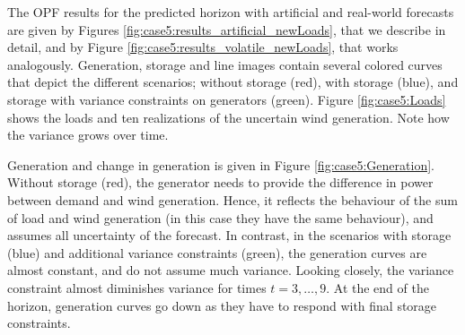 \documentclass[final,3p,times,twocolumn]{elsarticle}  %
\begin{document}

The OPF results for the predicted horizon with artificial and real-world forecasts are given by Figures \ref{fig:case5:results_artificial_newLoads}, that we describe in detail, and by Figure \ref{fig:case5:results_volatile_newLoads}, that works analogously.
Generation, storage and line images contain several colored curves that depict the different scenarios; without storage (red), with storage (blue), and storage with variance constraints on generators (green).
Figure \ref{fig:case5:Loads} shows the loads and ten realizations of the uncertain wind generation. Note how the variance grows over time.

Generation and change in generation is given in Figure \ref{fig:case5:Generation}. Without storage (red), the generator needs to provide the difference in power between demand and wind generation. Hence, it reflects the behaviour of the sum of load and wind generation (in this case they have the same behaviour), and assumes all uncertainty of the forecast. 
In contrast, in the scenarios with storage \caseStorage (blue) and additional variance constraints \caseStorageWithVariance (green), the generation curves are almost constant, and do not assume much variance. Looking closely, the variance constraint almost diminishes variance for times $t=3,\dots,9$.
At the end of the horizon, generation curves go down as they have to respond with final storage constraints. 
\end{document}

